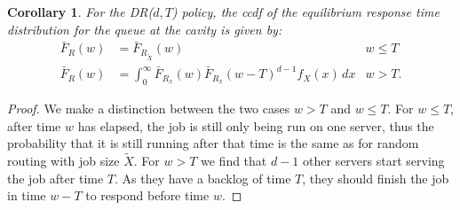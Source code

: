 \documentclass[12pt]{report}
\newtheorem{corollary}[theorem]{Corollary}
\begin{document}
\begin{corollary}
For the DR($d,T$) policy, the ccdf of the equilibrium response time distribution for the queue at the cavity is given by:
\begin{align*}
\bar F_R(w)
&= \bar F _{R_{\tilde X}}(w) & w \leq T\\
\bar F_R(w) &= \int_0^\infty \bar F_{R_x}(w) \bar F_{R_x}(w-T)^{d-1} f_X(x) \, dx & w > T.
\end{align*}
\end{corollary}
\begin{proof}
We make a distinction between the two cases $w > T$ and $w \leq T$. For $w\leq T$, after time $w$ has elapsed, the job is still only being run on one server, thus the probability that it is still running after that time is the same as for random routing with job size $\tilde X$. For $w>T$ we find that $d-1$ other servers start serving the job after time $T$. As they have a backlog of time $T$, they should finish the job in time $w-T$ to respond before time $w$.
\end{proof}
\end{document}
